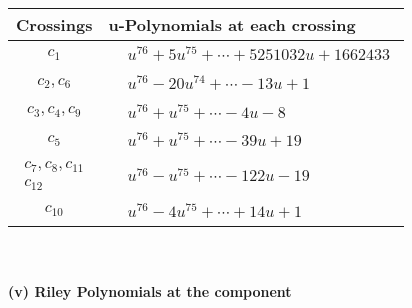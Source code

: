 \documentclass[1p]{elsarticle_modified}
\theoremstyle{definition}
\begin{document}
\begin{tabular}{m{50pt}|m{274pt}}
Crossings & \hspace{64pt}u-Polynomials at each crossing \\
\hline $$\begin{aligned}c_{1}\end{aligned}$$&$\begin{aligned}
&u^{76}+5 u^{75}+\cdots+5251032 u+1662433
\end{aligned}$\\
\hline $$\begin{aligned}c_{2},c_{6}\end{aligned}$$&$\begin{aligned}
&u^{76}-20 u^{74}+\cdots-13 u+1
\end{aligned}$\\
\hline $$\begin{aligned}c_{3},c_{4},c_{9}\end{aligned}$$&$\begin{aligned}
&u^{76}+u^{75}+\cdots-4 u-8
\end{aligned}$\\
\hline $$\begin{aligned}c_{5}\end{aligned}$$&$\begin{aligned}
&u^{76}+u^{75}+\cdots-39 u+19
\end{aligned}$\\
\hline $$\begin{aligned}c_{7},c_{8},c_{11}\\c_{12}\end{aligned}$$&$\begin{aligned}
&u^{76}- u^{75}+\cdots-122 u-19
\end{aligned}$\\
\hline $$\begin{aligned}c_{10}\end{aligned}$$&$\begin{aligned}
&u^{76}-4 u^{75}+\cdots+14 u+1
\end{aligned}$\\
\hline
\end{tabular}\\~\\
\newpage\renewcommand{\arraystretch}{1}
\flushleft \textbf{(v) Riley Polynomials at the component}\newline \\
\end{document}
